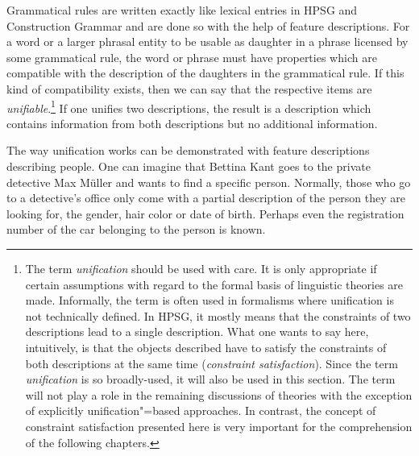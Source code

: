 \mbox{}%
Grammatical rules are written exactly like lexical entries in HPSG and Construction Grammar and are done so with the help of feature descriptions.
For a word or a larger phrasal entity to be usable as daughter in a phrase licensed by some
grammatical rule, the word or phrase must have properties which are compatible with the description of the daughters in the grammatical rule. If
this kind of compatibility exists, then we can say that the respective items are \emph{unifiable}.\footnote{%
	The term \emph{unification} should be used with care. It is only appropriate if certain assumptions with regard to the formal basis
	of linguistic theories are made. Informally, the term is often used in formalisms where unification is not technically defined. In HPSG, it mostly means that
	the constraints of two descriptions lead to a single description. What one wants to say here, intuitively, is that the objects described have to
	satisfy the constraints of both descriptions at the same time (\emph{constraint satisfaction}). Since the term \emph{unification} is so broadly-used,
	it will also be used in this section. The term will not play a role in the remaining discussions of theories with the exception of
	explicitly unification"=based approaches. In contrast, the concept of constraint satisfaction presented here is very important for the comprehension
	of the following chapters.%
}
If one unifies two descriptions, the result is a description which contains information from both descriptions but no additional information.

The way unification works can be demonstrated with feature descriptions describing people. One can imagine that Bettina Kant goes to the private detective
Max Müller and wants to find a specific person. Normally, those who go to a detective's office only come with a partial description of the person they
are looking for, \eg the gender, hair color or date of birth. Perhaps even the registration number of the car belonging to the person is known.

